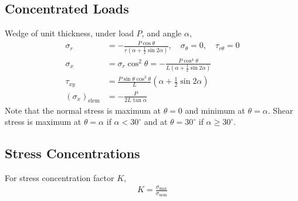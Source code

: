 \subsection*{Concentrated Loads}
Wedge of unit thickness, under load $P$, and angle $\alpha$,
\begin{align*}
    \sigma_{r} &= - \frac{P \cos{\theta}}{r(\alpha + \frac{1}{2}\sin{2\alpha})},\quad \sigma_{\theta} = 0, \quad \tau_{r\theta} = 0\\
    \sigma_{x} &= \sigma_{r} \cos^2{\theta} = - \frac{P \cos^4{\theta}}{L(\alpha + \frac{1}{2}\sin{2\alpha})} \\
    \tau_{xy} &= \frac{P\sin\theta \cos^3\theta}L(\alpha + \frac{1}{2}\sin{2\alpha}) \\
    (\sigma_{x})_{\text{elem}} &= - \frac{P}{2L\tan{\alpha}}
\end{align*}
Note that the normal stress is maximum at $\theta = 0$ and minimum at $\theta = \alpha$. Shear stress is maximum at 
$\theta = \alpha$ if $\alpha < 30^\circ$ and at $\theta = 30^\circ$ if $\alpha \geq 30^\circ$.

\subsection*{Stress Concentrations}

For stress concentration factor $K$,
\begin{align*}
    K = \frac{\sigma_{\text{max}}}{\sigma_{\text{nom}}}
\end{align*}
